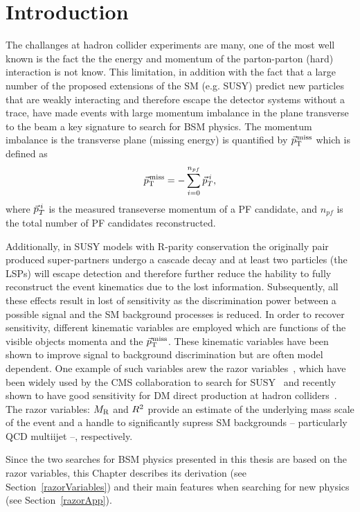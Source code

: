 \section{Introduction}
The challanges at hadron collider experiments are many, one of the
most well known is the fact the the energy and momentum of the parton-parton
(hard) interaction is not know. This limitation, in addition with the
fact that a large number of the proposed extensions of the SM (e.g. SUSY) predict
new particles that are weakly interacting and therefore escape the
detector systems without a trace, have made events with large momentum
imbalance in the plane transverse to the beam a key signature to
search for BSM physics. The momentum imbalance is the transverse plane
(missing energy)
is quantified by ${\vec p}_{\mathrm{T}}^{\kern1pt\text{miss}}$  which is defined as 
\begin{equation}
\label{eq:ptmiss}
{\vec p}_{\mathrm{T}}^{\kern1pt\text{miss}} = -\sum\limits_{i=0}^{n_{pf}} \vec{p}_{T}^{\hspace{0.06cm}i},
\end{equation}
where $\vec{p}_{T}^{\hspace{0.06cm}i}$ is the measured transeverse
momentum of a PF candidate, and $n_{pf}$ is the total number of PF
candidates reconstructed.

Additionally, in SUSY models with R-parity conservation the originally
pair produced super-partners undergo a cascade decay and at least two
particles (the LSPs) will escape detection and therefore further reduce the
hability to fully reconstruct the event kinematics due to the lost
information. Subsequently, all these effects result in lost of
sensitivity as the discrimination power between a possible
signal and the SM background processes is reduced. In order to recover
sensitivity, different kinematic variables are employed which are
functions of the visible objects momenta and the ${\vec p}_{\mathrm{T}}^{\kern1pt\text{miss}}$. These
kinematic variables have been shown to improve signal to background
discrimination but are often model dependent. One example of such
variables arew the razor variables~\cite{rogan,razor2010}, which have been widely used by the
CMS collaboration to search for
SUSY~\cite{Chatrchyan:2014goa,Razor8TeV} and recently shown to have
good sensitivity for DM direct production at hadron
colliders~\cite{Fox:2012ee}. The razor variables: $M_\mathrm{R}$ and $R^2$  provide an estimate of the
underlying mass scale of the event and a handle to significantly
supress SM backgrounds -- particularly QCD multiijet --,
respectively. 

Since the two searches for BSM physics presented in this thesis are
based on the razor variables, this Chapter describes its derivation
(see Section~\ref{razorVariables})
and their main features when searching for new physics (see Section~\ref{razorApp}).

